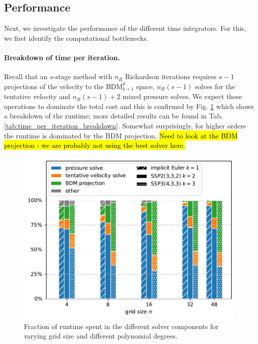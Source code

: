 \documentclass[11pt]{article}
\begin{document}
\subsection{Performance}
Next, we investigate the performance of the different time integrators. For this, we first identify the computational bottlenecks.
\paragraph{Breakdown of time per iteration.}
Recall that an $s$-stage method with $n_R$ Richardson iterations requires $s-1$ projections of the velocity to the $\text{BDM}_{k+1}^0$ space, $n_R(s-1)$ solves for the tentative velocity and $n_R(s-1)+2$ mixed pressure solves. We expect these operations to dominate the total cost and this is confirmed by Fig. \ref{fig:titer_breakdown} which shows a breakdown of the runtime; more detailed results can be found in Tab. \ref{tab:time_per_iteration_breakdown}. Somewhat surprisingly, for higher orders the runtime is dominated by the BDM projection. \hl{Need to look at the BDM projection - we are probably not using the best solver here.}
\begin{figure}
    \begin{center}
        \includegraphics[width=0.75\linewidth]{figures/titer_breakdown.pdf}
        \caption{Fraction of runtime spent in the different solver components for varying grid size and different polynomial degrees.}
        \label{fig:titer_breakdown}
    \end{center}
\end{figure}
\end{document}
